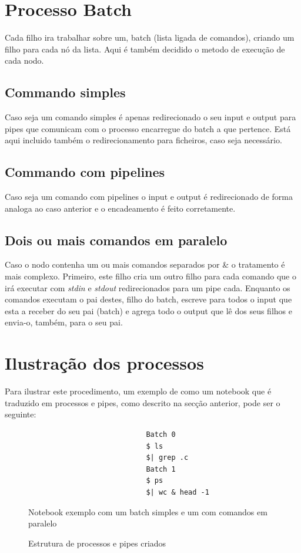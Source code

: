 \documentclass[12pt,a4paper]{report}
\begin{document}
    \section{Processo Batch}
        Cada filho ira trabalhar sobre um, batch (lista ligada de comandos),
        criando um filho para cada nó da lista. Aqui é também decidido o metodo
        de execução de cada nodo.
        \subsection{Commando simples}
            Caso seja um comando simples é apenas redirecionado o seu input e
            output para pipes que comunicam com o processo encarregue do batch a
            que pertence. Está aqui incluido também o redirecionamento para
            ficheiros, caso seja necessário.
        \subsection{Commando com pipelines}
            Caso seja um comando com pipelines o input e output é redirecionado
            de forma analoga ao caso anterior e o encadeamento é feito
            corretamente.
        \subsection{Dois ou mais comandos em paralelo}
            Caso o nodo contenha um ou mais comandos separados por \& o
            tratamento é mais complexo. Primeiro, este filho cria um outro
            filho para cada comando que o irá executar com \textit{stdin}
            e \textit{stdout} redirecionados para um pipe cada. Enquanto os
            comandos executam o pai destes, filho do batch, escreve para todos
            o input que esta a receber do seu pai (batch) e agrega todo o
            output que lê dos seus filhos e envia-o, também, para o seu pai.
\clearpage
    \section{Ilustração dos processos}
    Para ilustrar este procedimento, um exemplo de como um notebook que é
    traduzido em processos e pipes, como descrito na secção anterior, pode
    ser o seguinte:
    \begin{figure}[h]
        \begin{verbatim}
                            Batch 0
                            $ ls
                            $| grep .c
                            Batch 1
                            $ ps
                            $| wc & head -1
        \end{verbatim}
        \caption{Notebook exemplo com um batch simples e um com comandos em
                paralelo}
    \end{figure}
    \begin{figure}[h]
        
        \caption{Estrutura de processos e pipes criados}
    \end{figure}
\end{document}
